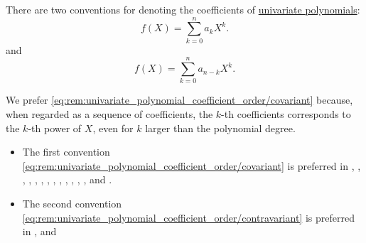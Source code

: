 \begin{remark}\label{rem:univariate_polynomial_coefficient_order}
  There are two conventions for denoting the coefficients of \hyperref[def:univariate_polynomial]{univariate polynomials}:
  \begin{equation}\label{eq:rem:univariate_polynomial_coefficient_order/covariant}
    f(X) = \sum_{k=0}^n a_k X^k.
  \end{equation}
  and
  \begin{equation}\label{eq:rem:univariate_polynomial_coefficient_order/contravariant}
    f(X) = \sum_{k=0}^n a_{n-k} X^k.
  \end{equation}

  We prefer \eqref{eq:rem:univariate_polynomial_coefficient_order/covariant} because, when regarded as a sequence of coefficients, the \( k \)-th coefficients corresponds to the \( k \)-th power of \( X \), even for \( k \) larger than the polynomial degree.

  \begin{itemize}
    \item The first convention \eqref{eq:rem:univariate_polynomial_coefficient_order/covariant} is preferred in
    \cite[97]{Lang2002Algebra},
    \cite[44]{Rotman2015AdvancedModernAlgebraPart1},
    \cite[9]{Knapp2016BasicAlgebra},
    \cite[def. III.1.19]{Aluffi2009Algebra},
    \cite[120]{Jacobson1985BasicAlgebraI},
    \cite[10]{FriedbergInselSpence2018LinearAlgebra},
    \cite[28]{Ahlfors1979ComplexAnalysis},
    \cite[\S 8.24]{Schechter1997AnalysisHandbook},
    \cite[96]{Маркушевич1967АналитическиеФункцииТом1},
    \cite[93]{Винберг2014КурсАлгебры},
    \cite[180]{Кострикин2000АлгебраЧасть1},
    \cite[118]{Тыртышников2017ОсновыАлгебры},
    \cite[132]{АлександровМаркушевичХинчинИПр1951ЭнциклопедияТом2},
    \cite[22]{ГеновМиховскиМоллов1991Алгебра} and
    \cite[120]{ИлинСадовничиСендов1984АнализТом1}.

    \item The second convention \eqref{eq:rem:univariate_polynomial_coefficient_order/contravariant} is preferred in
    \cite[131]{Курош1968КурсВысшейАлгебры},
    \cite[1]{Обрешков1962ВисшаАлгебра} and
    \cite[1]{Боянов2008ЧислениМетоди}
  \end{itemize}
\end{remark}

